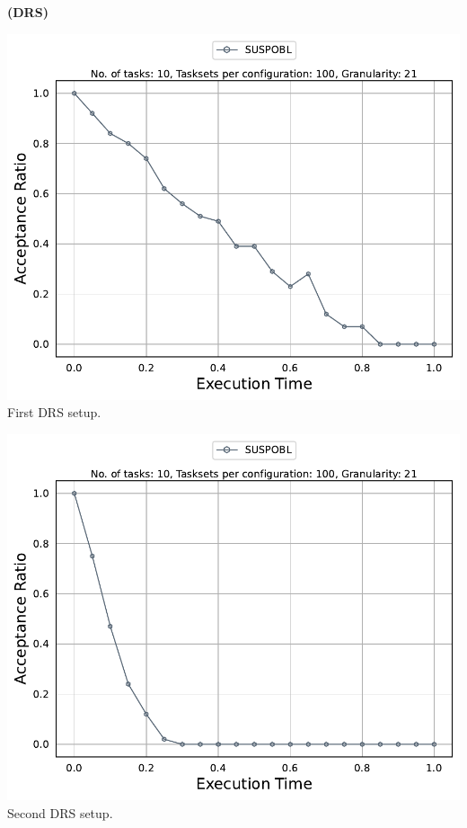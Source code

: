 \documentclass[]{article}
\begin{document}
	\begin{minipage}[t]{0.48\linewidth}
		\centering
		\textbf{(DRS)}
		\vspace{0.3cm}
		
		\includegraphics[width=\linewidth]{SUSPOBL_DRS_1stSetup.pdf}
		First DRS setup.
		\vspace{0.3cm}
		
		\includegraphics[width=\linewidth]{SUSPOBL_DRS_2ndSetup.pdf}
		Second DRS setup.
		\vspace{0.3cm}
		

\end{minipage}
\end{document}
